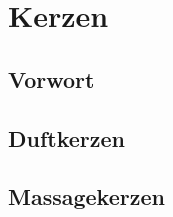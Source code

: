 \chapter{Kerzen}


\section{Vorwort}

\lipsum[1-5]
\newpage



\section{Duftkerzen}



\section{Massagekerzen}